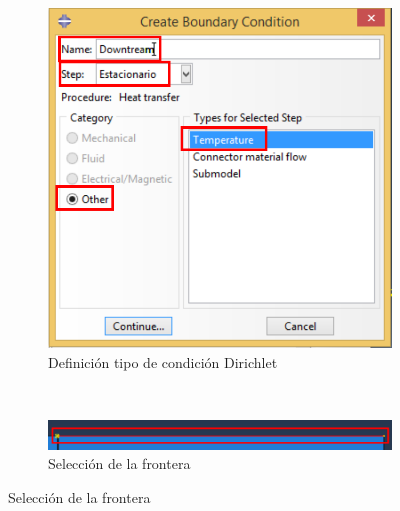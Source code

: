   \begin{figure}
    \centering
    \begin{subfigure}[!h]{0.42\textwidth}
      \includegraphics[width=\textwidth]{./body/images/load06.pdf}
      \caption{Definición tipo de condición Dirichlet}
      \label{load06}
    \end{subfigure}%
    ~ %
    \begin{subfigure}[!h]{0.55\textwidth}
      \includegraphics[width=\textwidth]{./body/images/load07.pdf}
      \caption{Selección de la frontera}
      \label{load07}
    \end{subfigure}%


\end{figure}
